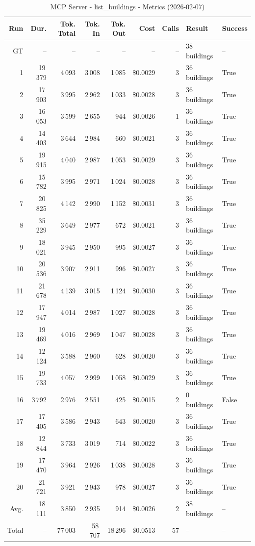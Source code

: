 \documentclass[a4paper,11pt]{article}
\begin{document}
\begin{table}[ht]
\centering
\scriptsize
\caption{MCP Server - list\_buildings - Metrics (2026-02-07)}
\label{tab:mcp\_list\_buildings\_metrics\_2026-02-07}
\begin{tabular}{r r r r r r r p{3cm} l}
\hline
Run & Dur. & Tok. Total & Tok. In & Tok. Out & Cost & Calls & Result & Success \\
\hline
GT & -- & -- & -- & -- & -- & -- & 38 buildings & -- \\
1 & 19\,379 & 4\,093 & 3\,008 & 1\,085 & \$0.0029 & 3 & 36 buildings & True \\
2 & 17\,903 & 3\,995 & 2\,962 & 1\,033 & \$0.0028 & 3 & 36 buildings & True \\
3 & 16\,053 & 3\,599 & 2\,655 & 944 & \$0.0026 & 1 & 36 buildings & True \\
4 & 14\,403 & 3\,644 & 2\,984 & 660 & \$0.0021 & 3 & 36 buildings & True \\
5 & 19\,915 & 4\,040 & 2\,987 & 1\,053 & \$0.0029 & 3 & 36 buildings & True \\
6 & 15\,782 & 3\,995 & 2\,971 & 1\,024 & \$0.0028 & 3 & 36 buildings & True \\
7 & 20\,825 & 4\,142 & 2\,990 & 1\,152 & \$0.0031 & 3 & 36 buildings & True \\
8 & 35\,229 & 3\,649 & 2\,977 & 672 & \$0.0021 & 3 & 36 buildings & True \\
9 & 18\,021 & 3\,945 & 2\,950 & 995 & \$0.0027 & 3 & 36 buildings & True \\
10 & 20\,536 & 3\,907 & 2\,911 & 996 & \$0.0027 & 3 & 36 buildings & True \\
11 & 21\,678 & 4\,139 & 3\,015 & 1\,124 & \$0.0030 & 3 & 36 buildings & True \\
12 & 17\,947 & 4\,014 & 2\,987 & 1\,027 & \$0.0028 & 3 & 36 buildings & True \\
13 & 19\,469 & 4\,016 & 2\,969 & 1\,047 & \$0.0028 & 3 & 36 buildings & True \\
14 & 12\,124 & 3\,588 & 2\,960 & 628 & \$0.0020 & 3 & 36 buildings & True \\
15 & 19\,733 & 4\,057 & 2\,999 & 1\,058 & \$0.0029 & 3 & 36 buildings & True \\
16 & 3\,792 & 2\,976 & 2\,551 & 425 & \$0.0015 & 2 & 0 buildings & False \\
17 & 17\,405 & 3\,586 & 2\,943 & 643 & \$0.0020 & 3 & 36 buildings & True \\
18 & 12\,844 & 3\,733 & 3\,019 & 714 & \$0.0022 & 3 & 36 buildings & True \\
19 & 17\,470 & 3\,964 & 2\,926 & 1\,038 & \$0.0028 & 3 & 36 buildings & True \\
20 & 21\,721 & 3\,921 & 2\,943 & 978 & \$0.0027 & 3 & 36 buildings & True \\
\hline
Avg. & 18\,111 & 3\,850 & 2\,935 & 914 & \$0.0026 & 2 & 38 buildings & -- \\
Total & -- & 77\,003 & 58\,707 & 18\,296 & \$0.0513 & 57 & -- & -- \\
\hline
\end{tabular}
\end{table}
\end{document}
